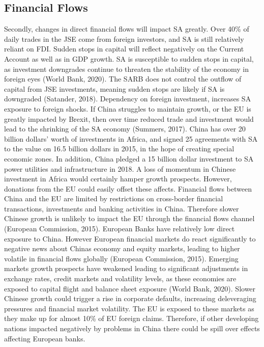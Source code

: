 \documentclass[11pt,preprint, authoryear]{elsarticle}
\numberwithin{equation}{section}
\numberwithin{figure}{section}
\numberwithin{table}{section}
\begin{document}
\hypertarget{financial-flows}{%
\subsection{Financial Flows}\label{financial-flows}}

Secondly, changes in direct financial flows will impact SA greatly. Over
40\% of daily trades in the JSE come from foreign investors, and SA is
still relatively reliant on FDI. Sudden stops in capital will reflect
negatively on the Current Account as well as in GDP growth. SA is
susceptible to sudden stops in capital, as investment downgrades
continue to threaten the stability of the economy in foreign eyes (World
Bank, 2020). The SARB does not control the outflow of capital from JSE
investments, meaning sudden stops are likely if SA is downgraded
(Satander, 2018). Dependency on foreign investment, increases SA
exposure to foreign shocks. If China struggles to maintain growth, or
the EU is greatly impacted by Brexit, then over time reduced trade and
investment would lead to the shrinking of the SA economy (Summers,
2017). China has over 20 billion dollars' worth of investments in
Africa, and signed 25 agreements with SA to the value on 16.5 billion
dollars in 2015, in the hope of creating special economic zones. In
addition, China pledged a 15 billion dollar investment to SA power
utilities and infrastructure in 2018. A loss of momentum in Chinese
investment in Africa would certainly hamper growth prospects. However,
donations from the EU could easily offset these affects. Financial flows
between China and the EU are limited by restrictions on cross-border
financial transactions, investments and banking activities in China.
Therefore slower Chinese growth is unlikely to impact the EU through the
financial flows channel (European Commission, 2015). European Banks have
relatively low direct exposure to China. However European financial
markets do react significantly to negative news about Chinas economy and
equity markets, leading to higher volatile in financial flows globally
(European Commission, 2015). Emerging markets growth prospects have
weakened leading to significant adjustments in exchange rates, credit
markets and volatility levels, as these economies are exposed to capital
flight and balance sheet exposure (World Bank, 2020). Slower Chinese
growth could trigger a rise in corporate defaults, increasing
deleveraging pressures and financial market volatility. The EU is
exposed to these markets as they make up for almost 10\% of EU foreign
claims. Therefore, if other developing nations impacted negatively by
problems in China there could be spill over effects affecting European
banks.
\end{document}
